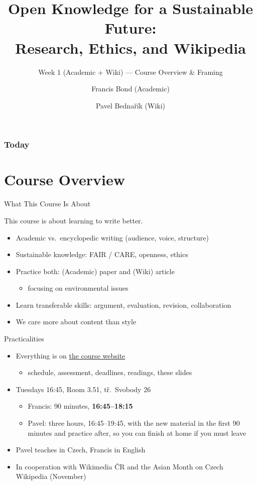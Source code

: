 \documentclass[aspectratio=169]{beamer}
\title[Open Knowledge --- Intro]{Open Knowledge for a Sustainable Future:\\ Research, Ethics, and Wikipedia}
\subtitle{Week 1 (Academic + Wiki) --- Course Overview \& Framing}
\author[Bond \& Bednařík]{Francis Bond (Academic) \and Pavel Bednařík (Wiki)}
\institute[UPOL \& Wikimedia]{Palacký University Olomouc \quad | \quad Wikimedia ČR}
\date{}
\newcommand{\website}{\href{https://bond-lab.github.io/Open-Knowledge/}{the course website}}
\begin{document}
\begin{frame}
  \titlepage
\end{frame}

\begin{frame}
  \frametitle{Today}
  \small
  \tableofcontents[hideallsubsections]
\end{frame}

\section{Course Overview}

\begin{frame}{What This Course Is About}
  \begin{center}
    {\Large This course is about learning to write better.}
  \end{center}
  \vspace{1ex}
\begin{itemize}
  \item Academic vs.\ encyclopedic writing (audience, voice, structure)
  \item Sustainable knowledge: FAIR / CARE, openness, ethics
  \item Practice both: (Academic) paper and (Wiki) article
    \begin{itemize}
    \item focusing on environmental issues
    \end{itemize}
  \item Learn transferable skills: argument, evaluation, revision, collaboration
  \item We care more about content than style
\end{itemize}
\end{frame}

\begin{frame}{Practicalities}
\begin{itemize}
  \item Everything is on \website
    \begin{itemize}
    \item schedule, assessment, deadlines, readings, these slides
    \end{itemize}
  \item Tuesdays 16:45, Room 3.51, tř.\ Svobody 26
    \begin{itemize}
    \item Francis: 90 minutes, \textbf{16:45--18:15}
    \item Pavel: three hours, 16:45--19:45, with the new material in the first
      90 minutes and practice after, so you can finish at home if you must leave
    \end{itemize}
  \item Pavel teaches in Czech, Francis in English
  \item In cooperation with Wikimedia ČR and the Asian Month on Czech
    Wikipedia (November)
\end{itemize}
\end{frame}
\end{document}
